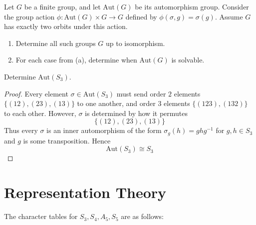 \begin{prob}[F2009-Q1]
    Let \( G \) be a finite group, and let \( \mathrm{Aut}(G) \) be its automorphism group. Consider the group action \( \phi \colon \mathrm{Aut}(G) \times G \to G \) defined by \( \phi(\sigma, g) = \sigma(g) \). Assume \( G \) has exactly two orbits under this action.
    
    \begin{enumerate}
        \item Determine all such groups \( G \) up to isomorphism.
        
        \item For each case from (a), determine when \( \mathrm{Aut}(G) \) is solvable.
    \end{enumerate}
\end{prob}

\begin{prob}[F2016-Q1]
    Determine $\text{Aut}(S_3)$.
\end{prob}
\begin{proof}
    Every element $\sigma\in\text{Aut}(S_3)$ must send order $2$ elements $\{(12), (23), (13)\}$ to one another, and order $3$ elements $\{(123), (132)\}$ to each other. However, $\sigma$ is determined by how it permutes 
    \begin{equation*}
        \{(12), (23), (13)\}
    \end{equation*}
    Thus every $\sigma$ is an inner automorphism of the form $\sigma_g(h)=ghg^{-1}$ for $g,h\in S_3$ and $g$ is some transposition. Hence 
    \begin{equation*}
        \text{Aut}(S_3)\cong S_3
    \end{equation*}
\end{proof}


\chapter{Representation Theory}




    

\begin{prop}
    
\end{prop}
\begin{prop}
    The character tables for $S_3, S_4, A_5, S_5$ are as follows:
\end{prop}

